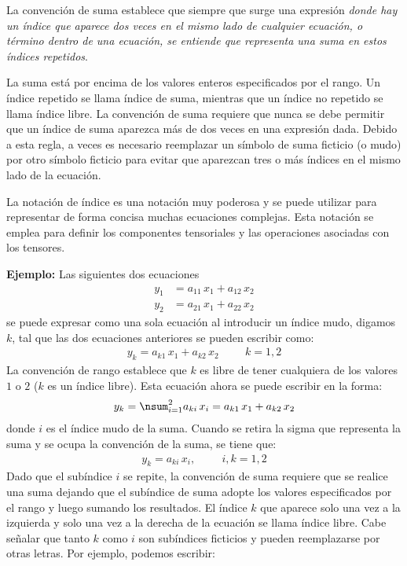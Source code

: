La convención de suma establece que siempre que surge una expresión \emph{donde hay un índice que aparece dos veces en el mismo lado de cualquier ecuación, o término dentro de una ecuación, se entiende que representa una suma en estos índices repetidos}.
\par
La suma está por encima de los valores enteros especificados por el rango. Un índice repetido se llama índice de suma, mientras que un índice no repetido se llama índice libre. La convención de suma requiere que nunca se debe permitir que un índice de suma aparezca más de dos veces en una expresión dada. Debido a esta regla, a veces es necesario reemplazar un símbolo de suma ficticio (o mudo) por otro símbolo ficticio para evitar que aparezcan tres o más índices en el mismo lado de la ecuación.
\par
La notación de índice es una notación muy poderosa y se puede utilizar para representar de forma concisa muchas ecuaciones complejas. Esta notación se emplea para definir los componentes tensoriales y las operaciones asociadas con los tensores.
\par
\noindent
\textbf{Ejemplo: }  Las siguientes dos ecuaciones
\begin{align*}
y_{1} & = a_{11} \, x_{1} + a_{12} \, x_{2} \\[0.5em]
y_{2} & = a_{21} \, x_{1} + a_{22} \, x_{2}
\end{align*}
se puede expresar como una sola ecuación al introducir un índice mudo, digamos $k$, tal que las dos ecuaciones anteriores se pueden escribir como:
\begin{align*}
y_{k} = a_{k1} \, x_{1} + a_{k2} \, x_{2} \hspace{1cm} k = 1, 2
\end{align*}
La convención de rango establece que $k$ es libre de tener cualquiera de los valores $1$ o $2$ ($k$ es un índice libre). Esta ecuación ahora se puede escribir en la forma:
\begin{align*}
y_{k} = \nsum_{i=1}^{2} a_{ki} \, x_{i} = a_{k1} \, x_{1} + a_{k2} \, x_{2}
\end{align*}
donde $i$ es el índice mudo de la suma. Cuando se retira la sigma que representa la suma y se ocupa la convención de la suma, se tiene que:
\begin{align*}
y_{k} = a_{ki} \, x_{i} , \hspace{1cm} i, k = 1, 2
\end{align*}
Dado que el subíndice $i$ se repite, la convención de suma requiere que se realice una suma dejando que el subíndice de suma adopte los valores especificados por el rango y luego sumando los resultados. El índice $k$ que aparece solo una vez a la izquierda y solo una vez a la derecha de la ecuación se llama índice libre. Cabe señalar que tanto $k$ como $i$ son subíndices ficticios y pueden reemplazarse por otras letras. Por ejemplo, podemos escribir:
